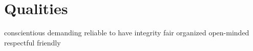 \section{Qualities}
   {conscientious}
   {demanding}
   {reliable}
   {to have integrity}
   {fair}
   {organized}
   {open-minded}
   {respectful}
   {friendly}
